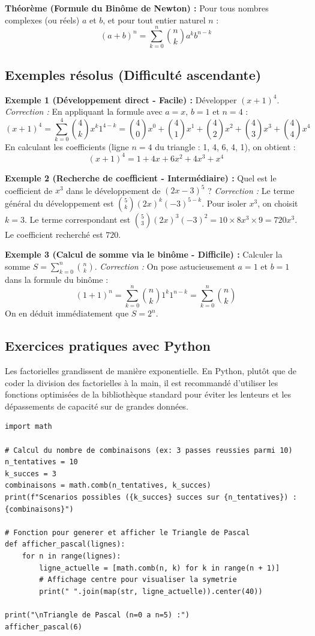 \textbf{Théorème (Formule du Binôme de Newton) :} Pour tous nombres complexes (ou réels) $a$ et $b$, et pour tout entier naturel $n$ :
$$ (a+b)^n = \sum_{k=0}^n \binom{n}{k} a^k b^{n-k} $$

\subsection{Exemples résolus (Difficulté ascendante)}

\textbf{Exemple 1 (Développement direct - Facile) :} 
Développer $(x+1)^4$.
\textit{Correction :} En appliquant la formule avec $a=x$, $b=1$ et $n=4$ :
$$ (x+1)^4 = \sum_{k=0}^4 \binom{4}{k} x^k 1^{4-k} = \binom{4}{0}x^0 + \binom{4}{1}x^1 + \binom{4}{2}x^2 + \binom{4}{3}x^3 + \binom{4}{4}x^4 $$
En calculant les coefficients (ligne $n=4$ du triangle : 1, 4, 6, 4, 1), on obtient :
$$ (x+1)^4 = 1 + 4x + 6x^2 + 4x^3 + x^4 $$

\textbf{Exemple 2 (Recherche de coefficient - Intermédiaire) :}
Quel est le coefficient de $x^3$ dans le développement de $(2x - 3)^5$ ?
\textit{Correction :} Le terme général du développement est $\binom{5}{k} (2x)^k (-3)^{5-k}$.
Pour isoler $x^3$, on choisit $k=3$.
Le terme correspondant est $\binom{5}{3} (2x)^3 (-3)^2 = 10 \times 8x^3 \times 9 = 720x^3$.
Le coefficient recherché est $720$.

\textbf{Exemple 3 (Calcul de somme via le binôme - Difficile) :}
Calculer la somme $S = \sum_{k=0}^n \binom{n}{k}$.
\textit{Correction :} On pose astucieusement $a = 1$ et $b = 1$ dans la formule du binôme :
$$ (1+1)^n = \sum_{k=0}^n \binom{n}{k} 1^k 1^{n-k} = \sum_{k=0}^n \binom{n}{k} $$
On en déduit immédiatement que $S = 2^n$. 

\subsection{Exercices pratiques avec Python}
Les factorielles grandissent de manière exponentielle. En Python, plutôt que de coder la division des factorielles à la main, il est recommandé d'utiliser les fonctions optimisées de la bibliothèque standard pour éviter les lenteurs et les dépassements de capacité sur de grandes données.

\begin{lstlisting}
import math

# Calcul du nombre de combinaisons (ex: 3 passes reussies parmi 10)
n_tentatives = 10
k_succes = 3
combinaisons = math.comb(n_tentatives, k_succes)
print(f"Scenarios possibles ({k_succes} succes sur {n_tentatives}) : {combinaisons}")

# Fonction pour generer et afficher le Triangle de Pascal
def afficher_pascal(lignes):
    for n in range(lignes):
        ligne_actuelle = [math.comb(n, k) for k in range(n + 1)]
        # Affichage centre pour visualiser la symetrie
        print(" ".join(map(str, ligne_actuelle)).center(40))

print("\nTriangle de Pascal (n=0 a n=5) :")
afficher_pascal(6)
\end{lstlisting}

